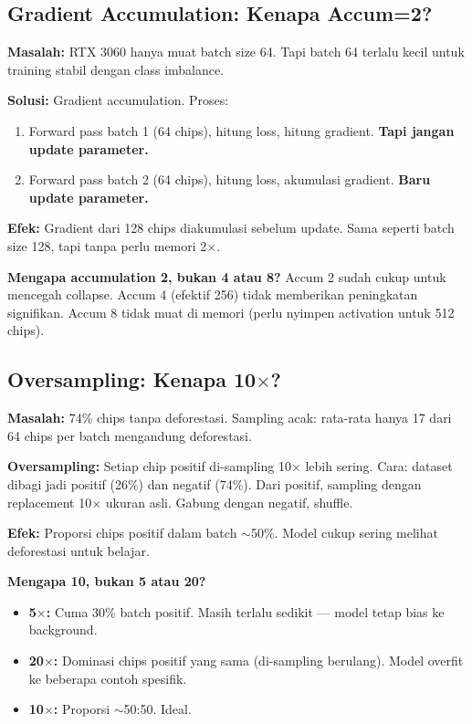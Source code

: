 \documentclass[10pt,a4paper,onecolumn]{article}
\begin{document}
\subsection{Gradient Accumulation: Kenapa Accum=2?}

\textbf{Masalah:} RTX 3060 hanya muat batch size 64. Tapi batch 64
terlalu kecil untuk training stabil dengan class imbalance.

\textbf{Solusi:} Gradient accumulation. Proses:
\begin{enumerate}[nosep]
    \item Forward pass batch 1 (64 chips), hitung loss, hitung
          gradient. \textbf{Tapi jangan update parameter.}
    \item Forward pass batch 2 (64 chips), hitung loss, akumulasi
          gradient. \textbf{Baru update parameter.}
\end{enumerate}

\textbf{Efek:} Gradient dari 128 chips diakumulasi sebelum update.
Sama seperti batch size 128, tapi tanpa perlu memori 2$\times$.

\textbf{Mengapa accumulation 2, bukan 4 atau 8?} Accum 2 sudah
cukup untuk mencegah collapse. Accum 4 (efektif 256) tidak memberikan
peningkatan signifikan. Accum 8 tidak muat di memori (perlu nyimpen
activation untuk 512 chips).

\subsection{Oversampling: Kenapa 10$\times$?}

\textbf{Masalah:} 74\% chips tanpa deforestasi. Sampling acak:
rata-rata hanya 17 dari 64 chips per batch mengandung deforestasi.

\textbf{Oversampling:} Setiap chip positif di-sampling 10$\times$
lebih sering. Cara: dataset dibagi jadi positif (26\%) dan negatif
(74\%). Dari positif, sampling dengan replacement 10$\times$ ukuran
asli. Gabung dengan negatif, shuffle.

\textbf{Efek:} Proporsi chips positif dalam batch $\sim$50\%. Model
cukup sering melihat deforestasi untuk belajar.

\textbf{Mengapa 10, bukan 5 atau 20?}
\begin{itemize}[nosep]
    \item \textbf{5$\times$:} Cuma 30\% batch positif. Masih terlalu
          sedikit — model tetap bias ke background.
    \item \textbf{20$\times$:} Dominasi chips positif yang sama
          (di-sampling berulang). Model overfit ke beberapa contoh
          spesifik.
    \item \textbf{10$\times$:} Proporsi $\sim$50:50. Ideal.
\end{itemize}
\end{document}
